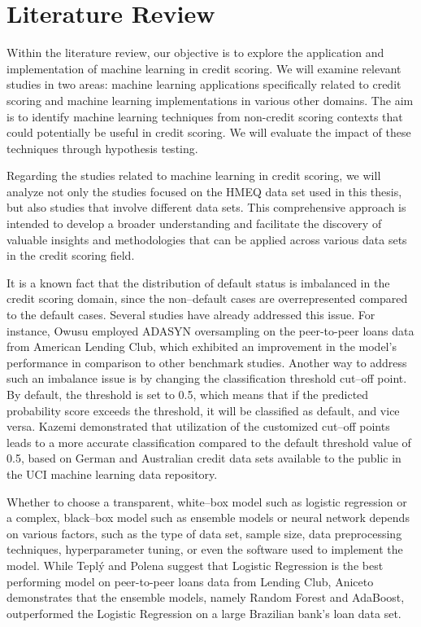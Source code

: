\chapter{Literature Review}
\label{chap:three}

Within the literature review, our objective is to explore the application and implementation of machine learning in credit scoring.
We will examine relevant studies in two areas: machine learning applications specifically related to credit scoring and machine learning implementations in various other domains. The aim is to identify machine learning techniques from non-credit scoring contexts that could potentially be useful in credit scoring. We will evaluate the impact of these techniques through hypothesis testing.


Regarding the studies related to machine learning in credit scoring, we will analyze not only the studies focused on the HMEQ data set used in this thesis, but also studies that involve different data sets. This comprehensive approach is intended to develop a broader understanding and facilitate the discovery of valuable insights and methodologies that can be applied across various data sets in the credit scoring field.


It is a known fact that the distribution of default status is imbalanced in the credit scoring domain, since the non--default cases are overrepresented compared to the default cases. Several studies have already addressed this issue.
For instance, Owusu \citep{owusu2023deep} employed ADASYN oversampling on the peer-to-peer loans data from American Lending Club, which exhibited an improvement in the model's performance in comparison to other benchmark studies.
Another way to address such an imbalance issue is by changing the classification threshold cut--off point.
By default, the threshold is set to 0.5, which means that if the predicted probability score exceeds the threshold, it will be classified as default, and vice versa. Kazemi \citep{kazemi2023estimation} demonstrated that utilization of the customized cut--off points leads to a more accurate classification compared to the default threshold value of 0.5, based on German and Australian credit data sets available to the public in the UCI machine learning data repository.



Whether to choose a transparent, white--box model such as logistic regression or a complex, black--box model such as ensemble models or neural network depends on various factors, such as the type of data set, sample size, data preprocessing techniques, hyperparameter tuning, or even the software used to implement the model.
While Tepl\'{y} and Polena \citep{teply2020best} suggest that Logistic Regression is the best performing model on peer-to-peer loans data from Lending Club, Aniceto  \citep{aniceto2020machine} demonstrates that the ensemble models, namely Random Forest and AdaBoost, outperformed the Logistic Regression on a large Brazilian bank's loan data set.



